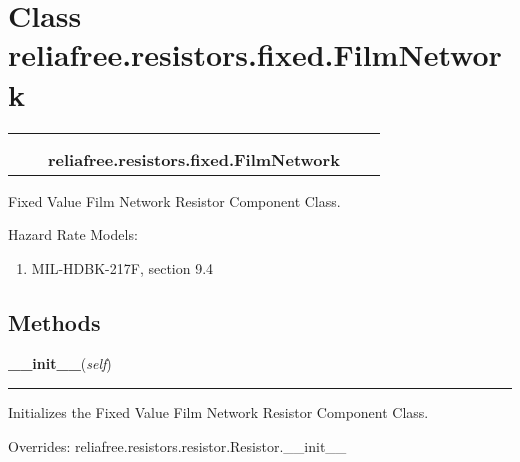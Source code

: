 %
%
%


\section{Class reliafree.resistors.fixed.FilmNetwork}

    \label{reliafree:resistors:fixed:FilmNetwork}
\begin{tabular}{cccccc}
\multicolumn{2}{r}{\settowidth{\BCL}{reliafree.resistors.resistor.Resistor}\multirow{2}{\BCL}{reliafree.resistors.resistor.Resistor}}
&&
  \\\cline{3-3}
  &&\multicolumn{1}{c|}{}
&&
  \\
&&\multicolumn{2}{l}{\textbf{reliafree.resistors.fixed.FilmNetwork}}
\end{tabular}

Fixed Value Film Network Resistor Component Class.

Hazard Rate Models:

\begin{enumerate}

\setlength{\parskip}{0.5ex}
  \item MIL-HDBK-217F, section 9.4

\end{enumerate}



  \subsection{Methods}

    \vspace{0.5ex}

\hspace{.8\funcindent}\begin{boxedminipage}{\funcwidth}

    \raggedright \textbf{\_\_init\_\_}(\textit{self})

    \vspace{-1.5ex}

    \rule{\textwidth}{0.5\fboxrule}
\setlength{\parskip}{2ex}
    Initializes the Fixed Value Film Network Resistor Component Class.

\setlength{\parskip}{1ex}
      Overrides: reliafree.resistors.resistor.Resistor.\_\_init\_\_

    \end{boxedminipage}

